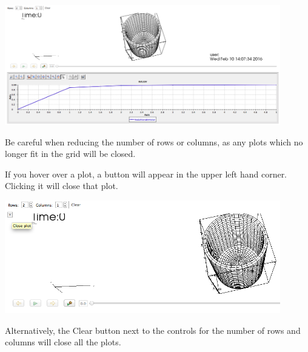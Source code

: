 \documentclass{article}
\begin{document}
\begin{center}
\includegraphics[width=12cm]{images/MOOSEEmbeddedVertical}
\end{center}

Be careful when reducing the number of rows or columns, as any plots which no
longer fit in the grid will be closed.

If you hover over a plot, a button will appear in the upper left hand
corner. Clicking it will close that plot.

\begin{center}
\includegraphics[width=12cm]{images/ClosePlotButton}
\end{center}

Alternatively, the Clear button next to the controls for the number of rows and
columns will close all the plots.
\end{document}
